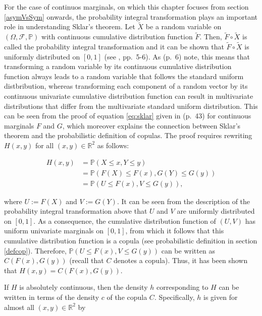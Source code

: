 \documentclass[
]{krantz}
\begin{document}
For the case of continuos marginals, on which this chapter focuses from section \ref{asymVsSym} onwards, the probability integral transformation plays an important role in understanding Sklar's theorem. Let \(\tilde{X}\) be a random variable on \((\Omega, \mathcal{F}, \mathbb{P})\) with continuous cumulative distribution function \(\tilde{F}\). Then, \(\tilde{F} \circ \tilde{X}\) is called the probability integral transformation and it can be shown that \(\tilde{F} \circ \tilde{X}\) is uniformly distributed on \([0,1]\) (see \citet{durante2016}, pp.~5-6). As \citet{durante2016} (p.~6) note, this means that transforming a random variable by its continuous cumulative distribution function always leads to a random variable that follows the standard uniform distbribution, whereas transforming each component of a random vector by its continuous univariate cumulative distribution function can result in multivariate distributions that differ from the multivariate standard uniform distribution. This can be seen from the proof of equation \eqref{eq:sklar} given in \citet{durante2016} (p.~43) for continuous marginals \(F\) and \(G\), which moreover explains the connection between Sklar's theorem and the probabilistic definition of copulas. The proof requires rewriting \(H(x,y)\) for all \((x, y) \in \mathbb{R}^2\) as follows:

\begin{equation*}
\begin{split}
H(x,y) 
&= \mathbb{P}(X \leq x, Y \leq y) \\
&= \mathbb{P}(F(X) \leq F(x), G(Y) \leq G(y)) \\
&= \mathbb{P}(U \leq F(x), V \leq G(y)),
\end{split}
\end{equation*}

where \(U := F(X)\) and \(V := G(Y)\).
It can be seen from the description of the probability integral transformation above that \(U\) and \(V\) are uniformly distributed on \([0,1]\). As a consequence, the cumulative distribution function of \((U,V)\) has uniform univariate marginals on \([0,1]\), from which it follows that this cumulative distribution function is a copula (see probabilistic definition in section \ref{defcop}). Therefore, \(\mathbb{P}(U \leq F(x), V \leq G(y))\) can be written as \(C(F(x), G(y))\) (recall that \(C\) denotes a copula). Thus, it has been shown that \(H(x,y)=C(F(x), G(y))\).

If \(H\) is absolutely continuous, then the density \(h\) corresponding to \(H\) can be written in terms of the density \(c\) of the copula \(C\). Specifically, \(h\) is given for almost all \((x,y) \in \mathbb{R}^2\) by
\end{document}
